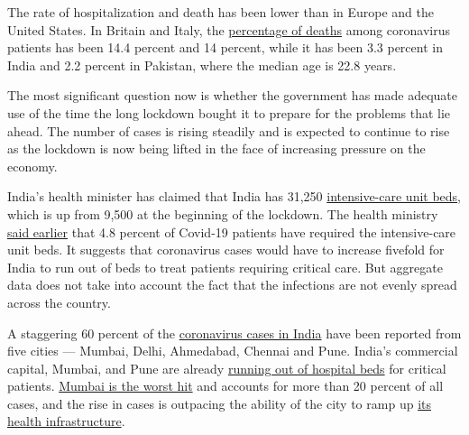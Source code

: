 The rate of hospitalization and death has been lower than in Europe and
the United States. In Britain and Italy, the
\href{https://www.aljazeera.com/news/2020/05/curious-case-south-asia-coronavirus-deaths-200518090320358.html?fbclid=IwAR1FGYaCMqywUKsVYAht_5mStk5eMh9qqheAz30rtutRr9kkJioC8fwhqCQ}{percentage
of deaths} among coronavirus patients has been 14.4 percent and 14
percent, while it has been 3.3 percent in India and 2.2 percent in
Pakistan, where the median age is 22.8 years.

The most significant question now is whether the government has made
adequate use of the time the long lockdown bought it to prepare for the
problems that lie ahead. The number of cases is rising steadily and is
expected to continue to rise as the lockdown is now being lifted in the
face of increasing pressure on the economy.

India's health minister has claimed that India has 31,250
\href{http://www.newsonair.com/Main-News-Details.aspx?id=389635}{intensive-care
unit beds}, which is up from 9,500 at the beginning of the lockdown. The
health ministry
\href{https://www.hindustantimes.com/india-news/number-of-critical-covid-19-patients-has-halved-across-the-country-shows-data/story-kucHQKQkI1TBc0sZO0SleI.html}{said
earlier} that 4.8 percent of Covid-19 patients have required the
intensive-care unit beds. It suggests that coronavirus cases would have
to increase fivefold for India to run out of beds to treat patients
requiring critical care. But aggregate data does not take into account
the fact that the infections are not evenly spread across the country.

A staggering 60 percent of the
\href{https://timesofindia.indiatimes.com/india/80-covid-cases-from-5-states-60-from-5-cities-govt/articleshow/75907372.cms}{coronavirus
cases in India} have been reported from five cities --- Mumbai, Delhi,
Ahmedabad, Chennai and Pune. India's commercial capital, Mumbai, and
Pune are already
\href{https://indianexpress.com/article/cities/mumbai/mumbai-hospitals-run-out-of-beds-for-critical-covid-patients-6407221/}{running
out of hospital beds} for critical patients.
\href{https://www.hindustantimes.com/india-news/sikkim-reports-first-case-number-of-infections-cross-50-000-in-maharashtra-covid-19-state-tally/story-4QGIQ0kg4Jb5wleLniN8dN.html}{Mumbai
is the worst hit} and accounts for more than 20 percent of all cases,
and the rise in cases is outpacing the ability of the city to ramp up
\href{https://indianexpress.com/article/explained/mumbai-coronavirus-covid-19-cases-hospital-beds-deaths-6413025/}{its
health infrastructure}.

